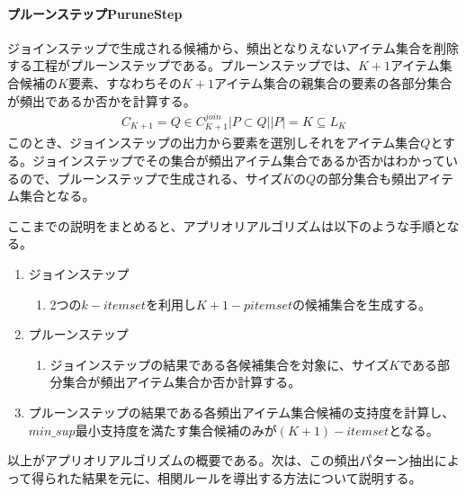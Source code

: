 \documentclass[dvipdfmx]{jsarticle}
\begin{document}
\paragraph{プルーンステップPuruneStep}
ジョインステップで生成される候補から、頻出となりえないアイテム集合を削除する工程がプルーンステップである。プルーンステップでは、$K+1$アイテム集合候補の$K$要素、すなわちその$K+1$アイテム集合の親集合の要素の各部分集合が頻出であるか否かを計算する。
\begin{gather*}
  C_{K+1} = {Q \in C_{K+1}^{join} | {P \subset Q | |P| = K} \subseteq L_{K}}
\end{gather*}
このとき、ジョインステップの出力から要素を選別しそれをアイテム集合$Q$とする。ジョインステップでその集合が頻出アイテム集合であるか否かはわかっているので、プルーンステップで生成される、サイズ$K$の$Q$の部分集合も頻出アイテム集合となる。\par
ここまでの説明をまとめると、アプリオリアルゴリズムは以下のような手順となる。
\begin{enumerate}
  \item ジョインステップ
  \begin{enumerate}
    \item 2つの$k-itemset$を利用し$K+1-pitemset$の候補集合を生成する。
  \end{enumerate}
  \item プルーンステップ
  \begin{enumerate}
    \item ジョインステップの結果である各候補集合を対象に、サイズ$K$である部分集合が頻出アイテム集合か否か計算する。
  \end{enumerate}
  \item プルーンステップの結果である各頻出アイテム集合候補の支持度を計算し、$min\_sup$最小支持度を満たす集合候補のみが$(K+1)-itemset$となる。
\end{enumerate}
以上がアプリオリアルゴリズムの概要である。次は、この頻出パターン抽出によって得られた結果を元に、相関ルールを導出する方法について説明する。
\end{document}
